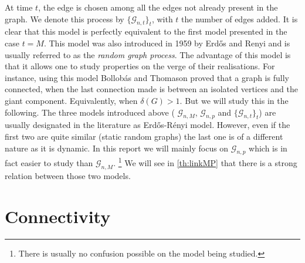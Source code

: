 At time $t$, the edge is chosen among all the edges not already present in the graph. We denote this process by $\{\mathcal{G}_{n, t}\}_t$, with $t$ the number of edges added. 
It is clear that this model is perfectly equivalent to the first model presented in the case $t = M$. 
This model was also introduced in 1959 by Erd\H{o}s and Renyi and is usually referred to as the \emph{random graph process}.
The advantage of this model is that it allows one to study properties on the verge of their realisations.
For instance, using this model Bollob\'as and Thomason \cite{Bollob85} proved that a graph is fully connected, when the last connection made is between an isolated vertices and the giant component. Equivalently, when $\delta(G) > 1$. But we will study this in the following.
\newline
The three models introduced above ( $\mathcal{G}_{n, M}$, $\mathcal{G}_{n, p}$ and $\{\mathcal{G}_{n, t}\}_t $) are usually designated in the literature as Erd\H{o}s-R\'enyi model.
However, even if the first two are quite similar (static random graphs) the last one is of a different nature as it is dynamic.
\newline
In this report we will mainly focus on $\mathcal{G}_{n, p}$ which is in fact easier to study than $\mathcal{G}_{n,M}$.
\footnote{There is usually no confusion possible on the model being studied.}
We will see in \ref{th:linkMP} that there is a strong relation between those two models.

\section{Connectivity}

